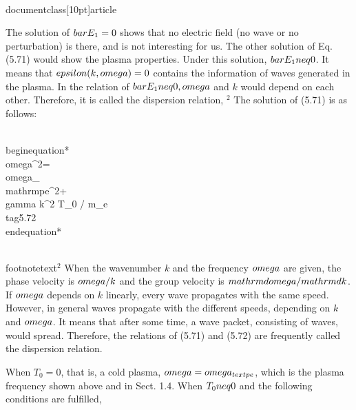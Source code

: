 \\documentclass[10pt]{article}
\begin{document}
{{{The solution of $\\bar{E}_{1}=0$ shows that no electric field (no wave or no perturbation) is there, and is not interesting for us. The other solution of Eq. (5.71) would show the plasma properties. Under this solution, $\\bar{E}_{1} \\neq 0$. It means that $\\epsilon(k, \\omega)=0$ contains the information of waves generated in the plasma. In the relation of $\\bar{E}_{1} \\neq 0, \\omega$ and $k$ would depend on each other. Therefore, it is called the dispersion relation, ${ }^{2}$ The solution of (5.71) is as follows:


\\begin{equation*}
\\omega^{2}=\\omega_{\\mathrm{pe}}^{2}+\\gamma k^{2} T_{0} / m_{e} \\tag{5.72}
\\end{equation*}

\\footnotetext{${ }^{2}$ When the wavenumber $k$ and the frequency $\\omega$ are given, the phase velocity is $\\omega / k$ and the group velocity is $\\mathrm{d} \\omega / \\mathrm{d} k$. If $\\omega$ depends on $k$ linearly, every wave propagates with the same speed. However, in general waves propagate with the different speeds, depending on $k$ and $\\omega$. It means that after some time, a wave packet, consisting of waves, would spread. Therefore, the relations of (5.71) and (5.72) are frequently called the dispersion relation.
}

When $T_{0}=0$, that is, a cold plasma, $\\omega=\\omega_{\\text {pe }}$, which is the plasma frequency shown above and in Sect. 1.4. When $T_{0} \\neq 0$ and the following conditions are fulfilled,


}}}
\end{document}
